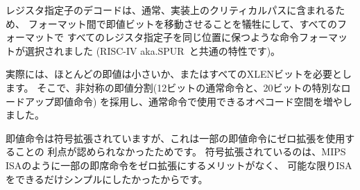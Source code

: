 \begin{comment}
\begin{commentary}
Decoding register specifiers is usually on the critical paths in
implementations, and so the instruction format was chosen to keep all
register specifiers at the same position in all formats at the expense
of having to move immediate bits across formats (a property shared
with RISC-IV aka. SPUR~\cite{spur-jsscc1989}).

In practice, most immediates are either small or require all XLEN
bits.  We chose an asymmetric immediate split (12 bits in regular
instructions plus a special load-upper-immediate instruction with 20
bits) to increase the opcode space available for regular instructions.

Immediates are sign-extended because we did not observe a benefit to
using zero-extension for some immediates as in the MIPS ISA and wanted
to keep the ISA as simple as possible.
\end{commentary}
\end{comment}

\begin{commentary}
レジスタ指定子のデコードは、通常、実装上のクリティカルパスに含まれるため、
フォーマット間で即値ビットを移動させることを犠牲にして、すべてのフォーマットで
すべてのレジスタ指定子を同じ位置に保つような命令フォーマットが選択されました
(RISC-IV aka.SPUR~\cite{spur-jsscc1989}と共通の特性です)。

実際には、ほとんどの即値は小さいか、またはすべてのXLENビットを必要とします。
そこで、非対称の即値分割(12ビットの通常命令と、20ビットの特別なロードアップ即値命令)
を採用し、通常命令で使用できるオペコード空間を増やしました。

即値命令は符号拡張されていますが、これは一部の即値命令にゼロ拡張を使用することの
利点が認められなかったためです。
符号拡張されているのは、MIPS ISAのように一部の即席命令をゼロ拡張にするメリットがなく、
可能な限りISAをできるだけシンプルにしたかったからです。
\end{commentary}

\begin{comment}
\section{Immediate Encoding Variants}

There are a further two variants of the instruction formats (B/J)
based on the handling of immediates, as shown in
Figure~\ref{fig:baseinstformatsimm}.
\end{comment}

